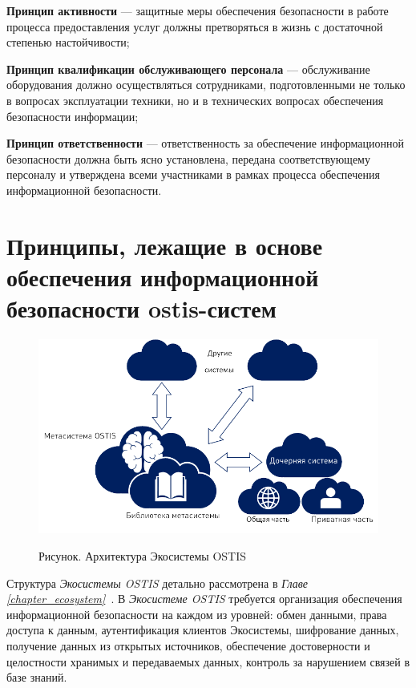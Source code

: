 \begin{textitemize}
	\item \textbf{Принцип активности} --- защитные меры обеспечения безопасности в работе процесса предоставления услуг должны претворяться в жизнь с достаточной степенью настойчивости;
	\item \textbf{Принцип квалификации обслуживающего персонала} --- обслуживание оборудования должно осуществляться сотрудниками, подготовленными не только в вопросах эксплуатации техники, но и в технических вопросах обеспечения безопасности информации;
	\item \textbf{Принцип ответственности} --- ответственность за обеспечение информационной безопасности должна быть ясно установлена, передана соответствующему персоналу и утверждена всеми участниками в рамках процесса обеспечения информационной безопасности.
\end{textitemize}

\section{Принципы, лежащие в основе обеспечения информационной безопасности ostis-систем}
\label{sec_security_principles}

\begin{figure}[H]
	\caption{Рисунок. Архитектура Экосистемы OSTIS}
	\includegraphics[scale=0.9]{images/part7/chapter_security/ecosystem_security.png}
	\label{fig:ecosystem_security}
\end{figure}

Структура \textit{Экосистемы OSTIS} детально рассмотрена в \textit{Главе \ref{chapter_ecosystem}~}.  В \textit{Экосистеме OSTIS} требуется организация обеспечения информационной безопасности на каждом из уровней: обмен данными, права доступа к данным, аутентификация клиентов Экосистемы, шифрование данных, получение данных из открытых источников, обеспечение достоверности и целостности хранимых и передаваемых данных, контроль за нарушением связей в базе знаний.

